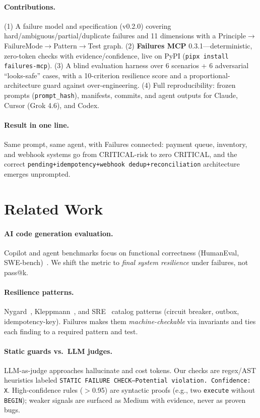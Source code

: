 \documentclass[conference]{IEEEtran}
\begin{document}
\paragraph{Contributions.}
(1) A failure model and specification (v0.2.0) covering hard/ambiguous/partial/duplicate failures and 11 dimensions with a Principle$\rightarrow$FailureMode$\rightarrow$Pattern$\rightarrow$Test graph.
(2) \textbf{Failures MCP} 0.3.1---deterministic, zero-token checks with evidence/confidence, live on PyPI (\texttt{pipx install failures-mcp}).
(3) A blind evaluation harness over 6 scenarios + 6 adversarial ``looks-safe'' cases, with a 10-criterion resilience score and a proportional-architecture guard against over-engineering.
(4) Full reproducibility: frozen prompts (\texttt{prompt\_hash}), manifests, commits, and agent outputs for Claude, Cursor (Grok 4.6), and Codex.

\paragraph{Result in one line.} Same prompt, same agent, with Failures connected: payment queue, inventory, and webhook systems go from CRITICAL-risk to zero CRITICAL, and the correct \texttt{pending+idempotency+webhook dedup+reconciliation} architecture emerges unprompted.
\section{Related Work}
\paragraph{AI code generation evaluation.} Copilot and agent benchmarks focus on functional correctness (HumanEval, SWE-bench)~\cite{copilot-eval}. We shift the metric to \emph{final system resilience} under failures, not pass@k.

\paragraph{Resilience patterns.} Nygard~\cite{releaseit}, Kleppmann~\cite{ddia}, and SRE~\cite{sre} catalog patterns (circuit breaker, outbox, idempotency-key). Failures makes them \emph{machine-checkable} via invariants and ties each finding to a required pattern and test.

\paragraph{Static guards vs.\ LLM judges.} LLM-as-judge approaches hallucinate and cost tokens. Our checks are regex/AST heuristics labeled \texttt{STATIC FAILURE CHECK---Potential violation. Confidence: X}. High-confidence rules ($>$0.95) are syntactic proofs (e.g., two \texttt{execute} without \texttt{BEGIN}); weaker signals are surfaced as Medium with evidence, never as proven bugs.
\end{document}
